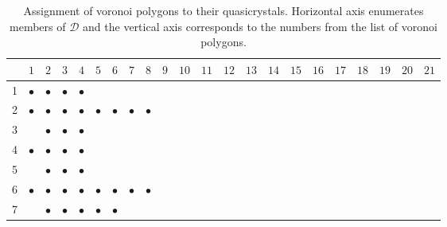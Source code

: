 \documentclass[text.tex]{subfiles}
\begin{document}
{\footnotesize
\begin{center}
\begin{longtable}{l|ccccccccccccccccccccc}
\caption{Assignment of voronoi polygons to their quasicrystals. Horizontal axis enumerates members of $\mathcal{D}$ and the vertical axis corresponds to the numbers from the list of voronoi polygons.} %
\label{table:tiles1} \\
	\toprule
		& $1$ 	    & $2$       & $3$       & $4$       & $5$       & $6$       & $7$       & $8$       & $9$       & $10$      & $11$      & $12$      & $13$      & $14$      & $15$      & $16$      & $17$      & $18$      & $19$      & $20$      & $21$      \\ 
	\midrule
1	  & $\bullet$	& $\bullet$ & $\bullet$ & $\bullet$	&           &           &           &           &           &           &           &           &           &           &           &           &           &           &           &           &           \\
2   & $\bullet$ & $\bullet$ & $\bullet$ & $\bullet$ & $\bullet$ & $\bullet$ & $\bullet$ & $\bullet$ &           &           &           &           &           &           &           &           &           &           &           &           &           \\
3   &           & $\bullet$ & $\bullet$ & $\bullet$ &           &           &           &           &           &           &           &           &           &           &           &           &           &           &           &           &           \\
4   & $\bullet$ & $\bullet$ & $\bullet$ & $\bullet$ &           &           &           &           &           &           &           &           &           &           &           &           &           &           &           &           &           \\
5   &           & $\bullet$ & $\bullet$ & $\bullet$ &           &           &           &           &           &           &           &           &           &           &           &           &           &           &           &           &           \\
6   & $\bullet$ & $\bullet$ & $\bullet$ & $\bullet$ & $\bullet$ & $\bullet$ & $\bullet$ & $\bullet$ &           &           &           &           &           &           &           &           &           &           &           &           &           \\
7   &           & $\bullet$ & $\bullet$ & $\bullet$ & $\bullet$ & $\bullet$ &           &           &           &           &           &           &           &           &           &           &           &           &           &           &           \\

\end{longtable}
\end{center}}
\end{document}
